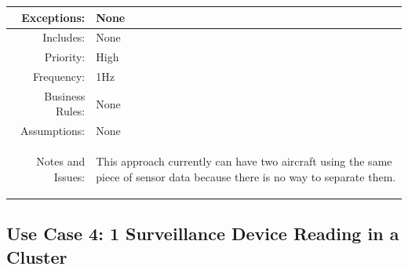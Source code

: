 \documentclass[12pt,oneside,letterpaper]{article}
\newenvironment{packed_enumerate}{ %
\vspace{-7mm}
\begin{enumerate}
  \setlength{\itemsep}{0pt}
  \setlength{\parskip}{0pt}
  \setlength{\parsep}{0pt}
}{\end{enumerate}
\vspace{-8mm}}
\begin{document}
\begin{longtable}{|r|p{3.8in}|}
\hline
Exceptions: & None\\
\hline
Includes: & None\\
\hline
Priority: & High\\
\hline
Frequency: & 1Hz\\
\hline
Business Rules:&None\\
\hline
Assumptions: & None\\
\hline
Notes and Issues: & 
\begin{packed_enumerate}
\item This approach currently can have two aircraft using the same piece of sensor data because there is no way to separate them.
\end{packed_enumerate}\\
\hline
\end{longtable}
   

\subsection{\label{Corr1}Use Case 4: 1 Surveillance Device Reading in a Cluster}
\end{document}
